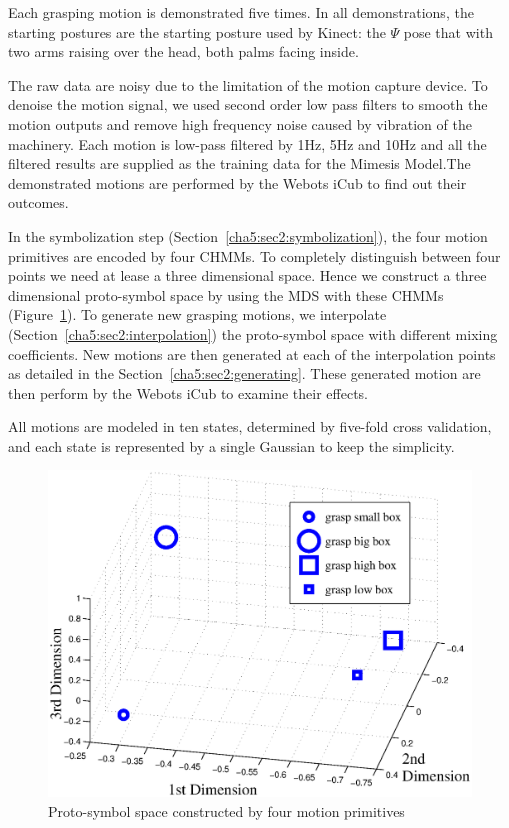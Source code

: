 Each grasping motion is demonstrated five times. In all demonstrations, the starting postures are the starting posture used by Kinect: the $\Psi$ pose that with two arms raising over the head, both palms facing inside.

The raw data are noisy due to the limitation of the motion capture device. To denoise the motion signal, we used second order low pass filters to smooth the motion outputs and remove high frequency noise caused by vibration of the machinery. Each motion is low-pass filtered by 1Hz, 5Hz and 10Hz and all the filtered results are supplied as the training data for the Mimesis Model.The demonstrated motions are performed by the Webots iCub to find out their outcomes.

In the symbolization step (Section~\ref{cha5:sec2:symbolization}), the four motion primitives are encoded by four CHMMs. To completely distinguish between four points we need at lease a three dimensional space. Hence we construct a three dimensional proto-symbol space by using the MDS with these CHMMs (Figure~\ref{fig:pss}). To generate new grasping motions, we interpolate (Section~\ref{cha5:sec2:interpolation}) the proto-symbol space with different mixing coefficients. New motions are then generated at each of the interpolation points as detailed in the Section~\ref{cha5:sec2:generating}. These generated motion are then perform by the Webots iCub to examine their effects.


All motions are modeled in ten states, determined by five-fold cross validation, and each state is represented by a single Gaussian to keep the simplicity.


\begin{figure}
  \centering
  \includegraphics[width=12cm]{./fig_cha5/pss2.eps}
  \caption{ \scriptsize{Proto-symbol space constructed by four motion primitives}
}
    \label{fig:pss}
\end{figure}


